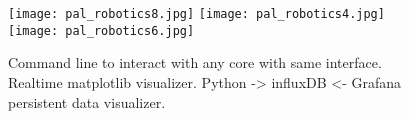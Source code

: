     \begin{figure}
      \begin{center}
         \texttt{[image: pal\_robotics8.jpg]}
         \texttt{[image: pal\_robotics4.jpg]}
         \texttt{[image: pal\_robotics6.jpg]}
      \end{center}
        \caption{Command line to interact with any core with same interface. Realtime matplotlib visualizer. Python -> influxDB <- Grafana persistent data visualizer. }
      \label{fig:novo_space}
   \end{figure}

